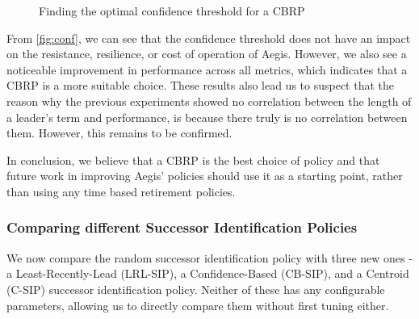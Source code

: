 \begin{figure}[!h]
	\centering
	\caption{Finding the optimal confidence threshold for a CBRP}
        \label{fig:conf}
\end{figure}

From \autoref{fig:conf}, we can see that the confidence threshold does not have an impact on the resistance, resilience, or cost of operation of Aegis. However, we also see a noticeable improvement in performance across all metrics, which indicates that a CBRP is a more suitable choice. These results also lead us to suspect that the reason why the previous experiments showed no correlation between the length of a leader's term and performance, is because there truly is no correlation between them. However, this remains to be confirmed.

In conclusion, we believe that a CBRP is the best choice of policy and that future work in improving Aegis' policies should use it as a starting point, rather than using any time based retirement policies.

\subsubsection{Comparing different Successor Identification Policies}
We now compare the random successor identification policy with three new ones - a Least-Recently-Lead (LRL-SIP), a Confidence-Based (CB-SIP), and a Centroid (C-SIP) successor identification policy. Neither of these has any configurable parameters, allowing us to directly compare them without first tuning either.

